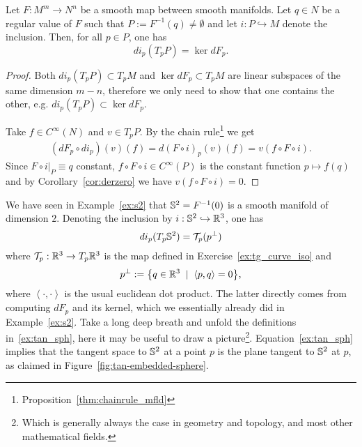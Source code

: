 \begin{proposition}
  Let $F:M^m\to N^n$ be a smooth map between smooth manifolds.
  Let $q\in N$ be a regular value of $F$ such that $P:=F^{-1}(q)\neq\emptyset$ and let $i:P\hookrightarrow M$ denote the inclusion.
  Then, for all $p\in P$, one has
  \begin{equation}
    d i_p(T_p P) = \ker dF_p.
  \end{equation}
\end{proposition}
\begin{proof}
  Both $d i_p(T_p P)\subset T_p M$ and $\ker dF_p \subset T_p M$ are linear subspaces of the same dimension $m-n$, therefore we only need to show that one contains the other, e.g. $d i_p(T_p P) \subset \ker dF_p$.

  Take $f\in C^\infty(N)$ and $v\in T_p P$. By the chain rule\footnote{Proposition~\ref{thm:chainrule_mfld}} we get
  \begin{align}
    (d F_p \circ d i_p)(v)(f) = d(F\circ i)_p(v)(f) = v(f\circ F\circ i).
  \end{align}
  Since $F\circ i\big|_{P} \equiv q$ constant, $f\circ F\circ i\in C^\infty(P)$ is the constant function $p \mapsto f(q)$ and by Corollary~\ref{cor:derzero} we have $v(f\circ F\circ i)=0$.
\end{proof}

\begin{example}
  We have seen in Example~\ref{ex:s2} that $\mathbb{S}^2 = F^{-1}(0)$ is a smooth manifold of dimension $2$.
  Denoting the inclusion by $i:\mathbb{S}^2 \hookrightarrow\mathbb{R}^3$, one has
  \begin{equation}\label{ex:tan_sph}
    di_p(T_p\mathbb{S}^2) = \mathcal{T}_p(p^\perp)
  \end{equation}
  where $\mathcal{T}_p:\mathbb{R}^3\to T_p\mathbb{R}^3$ is the map defined in Exercise~\ref{ex:tg_curve_iso} and
  \begin{equation}
    p^\perp := \big\{q\in\mathbb{R}^3 \;\mid\; \left\langle p, q\right\rangle = 0\big\},
  \end{equation}
  where $\left\langle\cdot,\cdot\right\rangle$ is the usual euclidean dot product. The latter directly comes from computing $dF_p$ and its kernel, which we essentially already did in Example~\ref{ex:s2}.
  Take a long deep breath and unfold the definitions in~\eqref{ex:tan_sph}, here it may be useful to draw a picture\footnote{Which is generally always the case in geometry and topology, and most other mathematical fields.}.
  Equation~\eqref{ex:tan_sph} implies that the tangent space to $\mathbb{S}^2$ at a point $p$ is the plane tangent to $\mathbb{S}^2$ at $p$, as claimed in Figure~\ref{fig:tan-embedded-sphere}.
\end{example}

